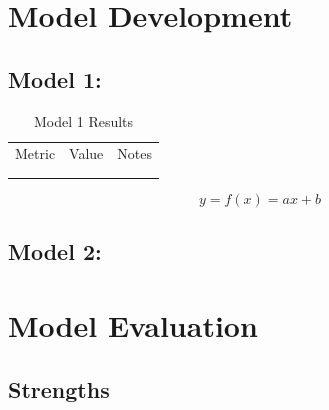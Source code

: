 \documentclass[12pt,a4paper]{article}
\renewcommand{\toprule}{\specialrule{1.5pt}{0pt}{0pt}}
\renewcommand{\midrule}{\specialrule{1.5pt}{0pt}{0pt}}
\renewcommand{\bottomrule}{\specialrule{1.5pt}{0pt}{0pt}}
\begin{document}
\section{Model Development}

\subsection{Model 1: \underline{\hspace{3cm}}}

\begin{table}[htbp]
    \centering
    \caption{Model 1 Results}
    \label{tab:model1}
    \begin{tabular}{ccc}
        \toprule
        Metric & Value & Notes \\
        \midrule
        \underline{\hspace{2cm}} & \underline{\hspace{2cm}} & \underline{\hspace{2cm}} \\
        \bottomrule
    \end{tabular}
\end{table}

\begin{equation}
    y = f(x) = ax + b
    \label{eq:linear}
\end{equation}

\subsection{Model 2: \underline{\hspace{3cm}}}

\section{Model Evaluation}

\subsection{Strengths}
\end{document}
